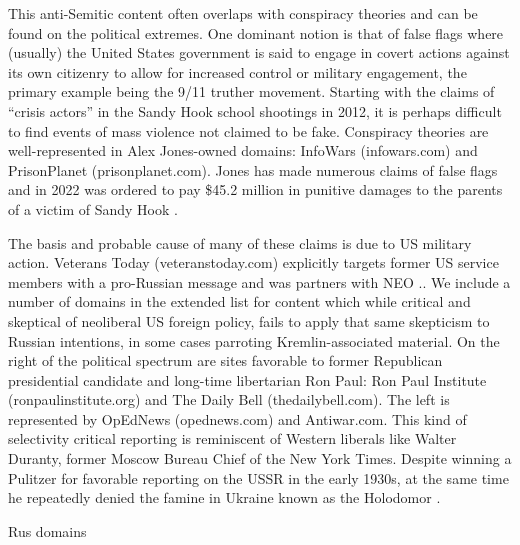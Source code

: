 This anti-Semitic content often overlaps with conspiracy theories and can be found on the political extremes.
One dominant notion is that of false flags where (usually) the United States government is said to engage in covert actions against its own citizenry to allow for increased control or military engagement, the primary example being the 9/11 truther movement.
Starting with the claims of ``crisis actors'' in the Sandy Hook school shootings in 2012, it is perhaps difficult to find events of mass violence not claimed to be fake.
Conspiracy theories are well-represented in Alex Jones-owned domains: InfoWars (infowars.com) and PrisonPlanet (prisonplanet.com).
Jones has made numerous claims of false flags and in 2022 was ordered to pay \$45.2 million in punitive damages to the parents of a victim of Sandy Hook \cite{jones2022}.

The basis and probable cause of many of these claims is due to US military action.
Veterans Today (veteranstoday.com) explicitly targets former US service members with a pro-Russian message and was partners with NEO \cite[p. 24]{statedept}..
We include a number of domains in the extended list for content which while critical and skeptical of neoliberal US foreign policy, fails to apply that same skepticism to Russian intentions, in some cases parroting Kremlin-associated material.
On the right of the political spectrum are sites favorable to former Republican presidential candidate and long-time libertarian Ron Paul: Ron Paul Institute (ronpaulinstitute.org) and The Daily Bell (thedailybell.com).
The left is represented by OpEdNews (opednews.com) and Antiwar.com.
This kind of selectivity critical reporting is reminiscent of Western liberals like Walter Duranty, former Moscow Bureau Chief of the New York Times.
Despite winning a Pulitzer for favorable reporting on the USSR in the early 1930s, at the same time he repeatedly denied the famine in Ukraine known as the Holodomor \cite[p. 445]{dutton2005}.

\begin{table}[!ht]
\centering
\caption{Rus domains}

\label{tab:rus_doms}
\end{table}


